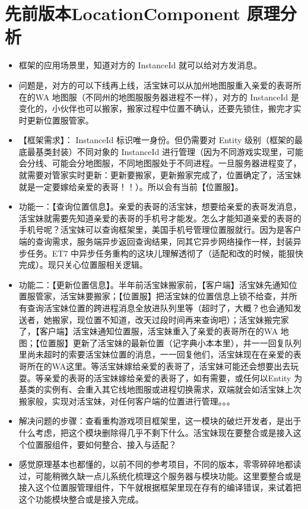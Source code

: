 \documentclass[9pt, b5paper]{article}
\begin{document}
\section{先前版本LocationComponent 原理分析}
\label{sec-5}
\begin{itemize}
\item 框架的应用场景里，知道对方的 InstanceId 就可以给对方发消息。
\item 问题是，对方的可以下线再上线，活宝妹可以从加州地图服重入亲爱的表哥所在的WA 地图服（不同州的地图服服务器进程不一样），对方的 InstanceId 是变化的，小伙伴也可以搬家，搬家过程中位置不确认，还要先锁住，搬完才实时更新位置服管家。
\item 【框架需求】： InstanceId 标识唯一身份。但仍需要对 Entity 级别（框架的最底最基类封装）不同对象的 InstanceId 进行管理（因为不同游戏实现里，可能会分线、可能会分地图服，不同地图服处于不同进程。一旦服务器进程变了，就需要对管家实时更新：更新要搬家，更新搬家完成了，位置确定了，活宝妹就是一定要嫁给亲爱的表哥！！）。所以会有当前【位置服】。
\item 功能一：【查询位置信息】。亲爱的表哥的活宝妹，想要给亲爱的表哥发消息，活宝妹就需要先知道亲爱的表哥的手机号才能发。怎么才能知道亲爱的表哥的手机号呢？活宝妹可以查询框架里，美国手机号管理位置服就行。因为是客户端的查询需求，服务端异步返回查询结果，同其它异步网络操作一样，封装异步任务。ET7 中异步任务重构的这块儿理解透彻了（适配和改的时候，能狠快完成）。现只关心位置服相关逻辑。
\item 功能二：【更新位置信息】。半年前活宝妹搬家前，【客户端】活宝妹先通知位置服管家，活宝妹要搬家；【位置服】把活宝妹的位置信息上锁不给查，并所有查询活宝妹位置的跨进程消息全放进队列里等（超时了，大概？也会通知发送者，她搬家，现位置不知道，改天过段时间再来查询吧）；活宝妹搬完家了，【客户端】活宝妹通知位置服，活宝妹重入了亲爱的表哥所在的WA 地图；【位置服】更新了活宝妹的最新位置（记字典小本本里），并一一回复队列里尚未超时的索要活宝妹位置的消息，一一回复他们，活宝妹现在在亲爱的表哥所在的WA这里。等活宝妹嫁给亲爱的表哥了，活宝妹可能还会想要出去玩耍。等亲爱的表哥的活宝妹嫁给亲爱的表哥了，如有需要，或任何以Entity 为基类的实例有、会重入其它线地图服或进程切换需求，双端就会如活宝妹上次搬家般，实现对活宝妹，对任何客户端的位置进行管理。。。
\item 解决问题的步骤：查看重构游戏项目框架里，这一模块的破烂开发者，是出于什么考虑，把这个模块删除得几乎不剩下什么。活宝妹现在要整合或是接入这个位置服组件，要如何整合、接入与适配？
\item 感觉原理基本也都懂的，以前不同的参考项目，不同的版本，零零碎碎地都读过，可能稍微久缺一点儿系统化梳理这个服务器与模块功能。这里要整合或是接入这个位置服管理组件，下午就根据框架里现在存有的编译错误，来试着把这个功能模块整合或是接入完成。

\end{itemize}
\end{document}
